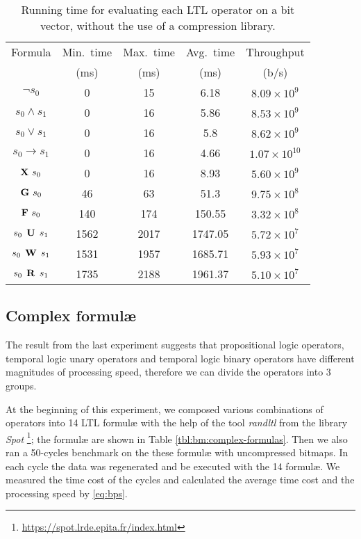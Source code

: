 \begin{table}
\centering
\begin{tabular}{|c|c|c|c|c|}
\hline
Formula & Min.\ time & Max.\ time & Avg.\ time & Throughput \\
& (ms) & (ms) & (ms) & (b/s) \\
\hline
$\neg s_0$ & 0 & 15 & 6.18 & $8.09 \times 10^{9}$ \\
\hline
$s_0 \wedge s_1$ & 0 & 16 & 5.86 & $8.53 \times 10^{9}$ \\
\hline
$s_0 \vee s_1$ & 0 & 16 & 5.8 & $8.62 \times 10^{9}$ \\
\hline
$s_0 \rightarrow s_1$ & 0 & 16 & 4.66 & $1.07 \times 10^{10}$ \\
\hline
$\mathop{\mbox{\textbf{X}}}\, s_0$ & 0 & 16 & 8.93 & $5.60 \times 10^{9}$ \\
\hline
$\mathop{\mbox{\textbf{G}}}\, s_0$ & 46 & 63 & 51.3 & $9.75 \times 10^8$ \\
\hline
$\mathop{\mbox{\textbf{F}}}\, s_0$ & 140 & 174 & 150.55 & $3.32 \times 10^8$ \\
\hline
$s_0 \mathrel{\mbox{\,\textbf{U}}}\, s_1$ & 1562 & 2017 & 1747.05 & $5.72 \times 10^7$ \\
\hline
$s_0 \mathrel{\mbox{\,\textbf{W}}}\, s_1$ & 1531 & 1957 & 1685.71 & $5.93 \times 10^7$ \\
\hline
$s_0 \mathrel{\mbox{\,\textbf{R}}}\, s_1$ & 1735 & 2188 & 1961.37 & $5.10 \times 10^7$ \\
\hline
\end{tabular}
\vskip 8pt
\caption{Running time for evaluating each LTL operator on a bit vector, without the use of a compression library.}
\label{tbl:bm:basicops}
\end{table}


\subsection{Complex formul\ae{}} %

The result from the last experiment suggests that propositional logic operators, temporal logic unary operators and temporal logic binary operators have different magnitudes of processing speed, therefore we can divide the operators into 3 groups.

At the beginning of this experiment, we composed various combinations of operators into 14 LTL formul\ae{} with the help of the tool \emph{randltl} from the library \textit{Spot} \footnote{\url{https://spot.lrde.epita.fr/index.html}}; the formul\ae{} are shown in Table \ref{tbl:bm:complex-formulas}. Then we also ran a 50-cycles benchmark on the these formul\ae{} with uncompressed bitmaps. In each cycle the data was regenerated and be executed with the 14 formul\ae{}. We measured the time cost of the cycles and calculated the average time cost and the processing speed by \eqref{eq:bps}.

